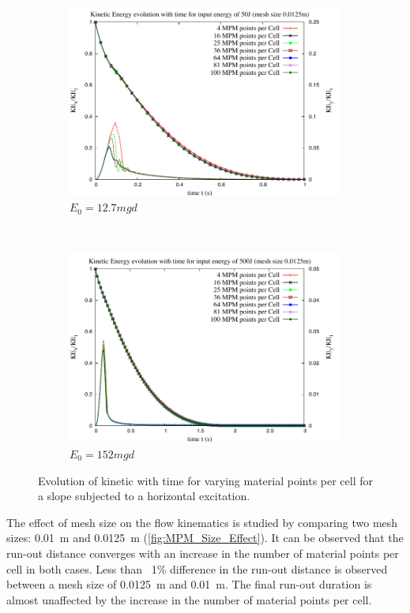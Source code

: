\begin{figure}[tbhp]
\centering
\begin{subfigure}[b]{0.9\textwidth}
\includegraphics[width=\textwidth]{KE_50}
\caption{$E_0=12.7mgd$}
\label{fig:KE_50}
\end{subfigure}
\\
\begin{subfigure}[b]{0.9\textwidth}
\centering
\includegraphics[width=\textwidth]{KE_500}
\caption{$E_0=152mgd$}
\label{fig:KE_500}
\end{subfigure}
\caption{Evolution of kinetic with time for varying material points per cell 
for a slope subjected to a horizontal excitation.}
\label{fig:KE_MPM}
\end{figure}

The effect of mesh size on the flow kinematics is studied by comparing two mesh 
sizes: 0.01~\si{\m} and 0.0125~\si{\m} (\cref{fig:MPM_Size_Effect}). It can 
be observed that the run-out distance converges with an increase in the number 
of material points per cell in both cases. Less than ~1\% difference in the 
run-out distance is observed between a mesh size of 0.0125~\si{\m} and 
0.01~\si{\m}. The final run-out duration is almost unaffected by the increase 
in the number of material points per cell. 
 

